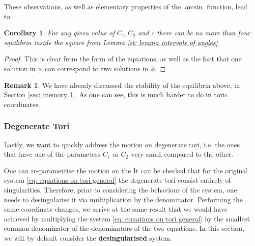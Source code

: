\documentclass{article}
\newtheorem{corollary}[theorem]{Corollary}
\newtheorem{lemma}[theorem]{Lemma}
\theoremstyle{definition}
\newtheorem{remark}[theorem]{Remark}
\numberwithin{equation}{section}
\begin{document}
These observations, as well as elementary properties of the $\arcsin$ function, lead to: 
\begin{corollary}
    For any given value of $C_1, C_2$ and $c$ there can be no more than four equilibria inside the square from Lemma \ref{st: lemma intervals of angles}. 
\end{corollary}
\begin{proof}
    This is clear from the form of the equations, as well as the fact that one solution in $\psi$ can correspond to two solutions in $\phi$. 
\end{proof}




    
\begin{remark}
    We have already discussed the stability of the equilibria above, in Section \ref{sec: memory 1}. As one can see, this is much harder to do in toric coordinates. 
\end{remark}
\subsubsection{Degenerate Tori}
Lastly, we want to quickly address the motion on degenerate tori, i.e. the ones that have one of the parameters $C_1$ or $C_2$ very small compared to the other. 

One can re-parametrise the motion on the 
It can be checked that for the original system \ref{eq: equations on tori general} the degenerate tori consist entirely of singularities. Therefore, prior to considering the behaviour of the system, one needs to desingularise it via multiplication by the denominator. Performing the same coordinate changes, we arrive at the same result that we would have achieved by multiplying the system \eqref{eq: equations on tori general} by the smallest common denominator of the denominators of the two equations. In this section, we will by default consider the \textbf{desingularised} system.\\
\end{document}
